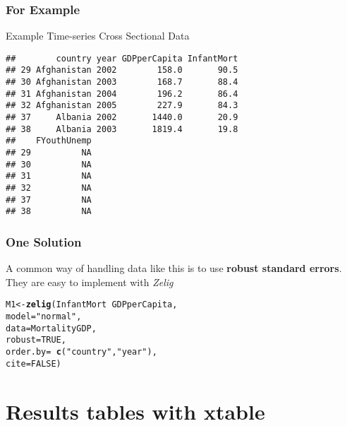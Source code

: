 \documentclass{beamer}\usepackage{graphicx, color}
\makeatletter
\newcommand{\hlfunctioncall}[1]{\textcolor[rgb]{0.501960784313725,0,0.329411764705882}{\textbf{#1}}}%
\newcommand{\hlstring}[1]{\textcolor[rgb]{0.6,0.6,1}{#1}}%
\newenvironment{kframe}{%
 \def\at@end@of@kframe{}%
 \ifinner\ifhmode%
  \def\at@end@of@kframe{\end{minipage}}%
  \begin{minipage}{\columnwidth}%
 \fi\fi%
 \def\FrameCommand##1{\hskip\@totalleftmargin \hskip-\fboxsep
 \colorbox{shadecolor}{##1}\hskip-\fboxsep
     \hskip-\linewidth \hskip-\@totalleftmargin \hskip\columnwidth}%
 \MakeFramed {\advance\hsize-\width
   \@totalleftmargin\z@ \linewidth\hsize
   \@setminipage}}%
 {\par\unskip\endMakeFramed%
 \at@end@of@kframe}
\newenvironment{knitrout}{}{} %
\makeatother
\begin{document}
\begin{frame}[fragile]
  \frametitle{For Example}
  {\LARGE{Example Time-series Cross Sectional Data}}
\begin{knitrout}
\color{fgcolor}\begin{kframe}
\begin{verbatim}
##        country year GDPperCapita InfantMort
## 29 Afghanistan 2002        158.0       90.5
## 30 Afghanistan 2003        168.7       88.4
## 31 Afghanistan 2004        196.2       86.4
## 32 Afghanistan 2005        227.9       84.3
## 37     Albania 2002       1440.0       20.9
## 38     Albania 2003       1819.4       19.8
##    FYouthUnemp
## 29          NA
## 30          NA
## 31          NA
## 32          NA
## 37          NA
## 38          NA
\end{verbatim}
\end{kframe}
\end{knitrout}

\end{frame}

\begin{frame}[fragile]
  \frametitle{One Solution}
  A common way of handling data like this is to use \textbf{robust standard errors}. \\[0.5cm]
  They are easy to implement with \emph{Zelig}


\begin{knitrout}
\color{fgcolor}\begin{kframe}
\begin{alltt}
M1 <- \hlfunctioncall{zelig}(InfantMort ~ GDPperCapita, 
            model = \hlstring{"normal"},
            data = MortalityGDP,
            robust = TRUE, 
            order.by = ~\hlfunctioncall{c}(\hlstring{"country"}, \hlstring{"year"}),
            cite = FALSE)
\end{alltt}
\end{kframe}
\end{knitrout}

\end{frame}


\begin{frame}[fragile]


\end{frame}

\section{Results tables with xtable}
\end{document}
